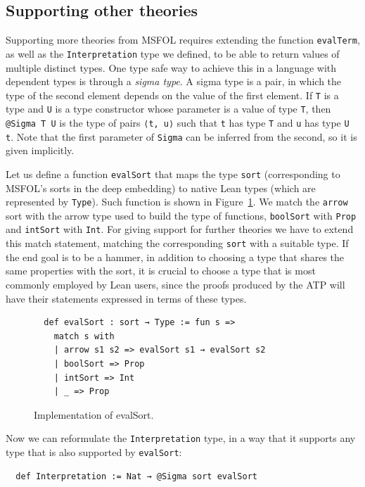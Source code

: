 \subsection{Supporting other theories}

Supporting more theories from MSFOL requires extending the function \texttt{evalTerm},
as well as the \texttt{Interpretation} type we defined, to be able to return values
of multiple distinct types. One type safe way to achieve this in a language with
dependent types is through a \textit{sigma type}. A sigma type is a pair, in which
the type of the second element depends on the value of the first element. If
\texttt{T} is a type and \texttt{U} is a type constructor whose parameter
is a value of type \texttt{T},
then \texttt{@Sigma T U} is the type
of pairs \texttt{⟨t, u⟩} such that \texttt{t} has type \texttt{T} and
\texttt{u} has type \texttt{U t}. Note that the first parameter of \texttt{Sigma}
can be inferred from the second, so it is given implicitly.

Let us define a function \texttt{evalSort} that maps the type \texttt{sort}
(corresponding to MSFOL's sorts in the deep embedding) to native Lean types
(which are represented by \texttt{Type}). Such function is shown in Figure~\ref{impEvalSort}.
We match the \texttt{arrow} sort with the arrow type used to build the type of
functions, \texttt{boolSort} with \texttt{Prop} and \texttt{intSort} with \texttt{Int}.
For giving support for further theories we have to extend this match statement,
matching the corresponding \texttt{sort} with a suitable type.
If the end goal is to be a hammer, in addition to choosing a type that shares the
same properties with the sort, it is crucial to choose a type that is most commonly
employed by Lean users, since the proofs produced by the ATP will have their
statements expressed in terms of these types.

\begin{figure}[t]
\begin{verbatim}
  def evalSort : sort → Type := fun s =>
    match s with
    | arrow s1 s2 => evalSort s1 → evalSort s2
    | boolSort => Prop
    | intSort => Int
    | _ => Prop
\end{verbatim}
\caption{Implementation of evalSort.}\label{impEvalSort}
\end{figure}

Now we can reformulate the \texttt{Interpretation} type, in a way that
it supports any type that is also supported by \texttt{evalSort}:

\begin{verbatim}
  def Interpretation := Nat → @Sigma sort evalSort
\end{verbatim}

